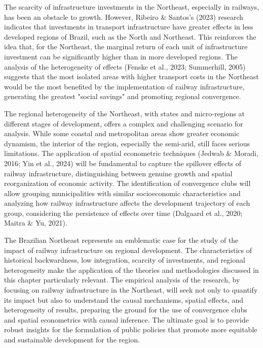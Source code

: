 \documentclass[12pt, a4paper]{article}
\begin{document}
The scarcity of infrastructure investments in the Northeast, especially in railways, has been an obstacle to growth. However, Ribeiro \& Santos's (2023) research indicates that investments in transport infrastructure have greater effects in less developed regions of Brazil, such as the North and Northeast. This reinforces the idea that, for the Northeast, the marginal return of each unit of infrastructure investment can be significantly higher than in more developed regions. The analysis of the heterogeneity of effects (Fenske et al., 2023; Summerhill, 2005) suggests that the most isolated areas with higher transport costs in the Northeast would be the most benefited by the implementation of railway infrastructure, generating the greatest "social savings" and promoting regional convergence. 

The regional heterogeneity of the Northeast, with states and micro-regions at different stages of development, offers a complex and challenging scenario for analysis. While some coastal and metropolitan areas show greater economic dynamism, the interior of the region, especially the semi-arid, still faces serious limitations. The application of spatial econometric techniques (Jedwab \& Moradi, 2016; Yin et al., 2024) will be fundamental to capture the spillover effects of railway infrastructure, distinguishing between genuine growth and spatial reorganization of economic activity. The identification of convergence clubs will allow grouping municipalities with similar socioeconomic characteristics and analyzing how railway infrastructure affects the development trajectory of each group, considering the persistence of effects over time (Dalgaard et al., 2020; Maitra \& Yu, 2021). 

The Brazilian Northeast represents an emblematic case for the study of the impact of railway infrastructure on regional development. The characteristics of historical backwardness, low integration, scarcity of investments, and regional heterogeneity make the application of the theories and methodologies discussed in this chapter particularly relevant. The empirical analysis of the research, by focusing on railway infrastructure in the Northeast, will seek not only to quantify its impact but also to understand the causal mechanisms, spatial effects, and heterogeneity of results, preparing the ground for the use of convergence clubs and spatial econometrics with causal inference. The ultimate goal is to provide robust insights for the formulation of public policies that promote more equitable and sustainable development for the region. 
\end{document}
